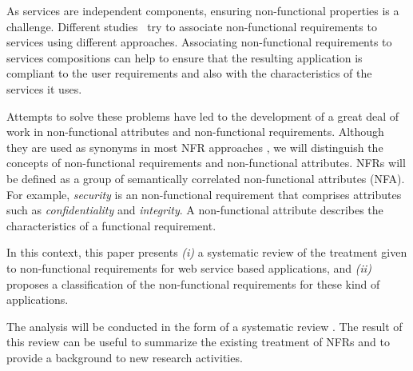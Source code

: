 \documentclass{sig-alternate}
\begin{document}
As services are independent components, ensuring non-functional properties is a
challenge.
Different
studies~\cite{Babamir2010,AgarwalLS09,CholletL09,GutierrezRF10,XiaoCZBOLH08,JeongCL09,TsadimasNA12}
try to associate non-functional requirements to services using different approaches. 
Associating non-functional requirements to services
compositions can help to ensure that the resulting application is compliant to
the user requirements and also with the characteristics of the services it uses.
 


 Attempts to solve these problems have led to the development of a great deal of
 work in non-functional attributes and non-functional requirements. Although
 they are used as synonyms in most NFR approaches \cite{MairizaZN10}, we will
 distinguish the concepts of non-functional requirements and non-functional attributes.
 NFRs will be defined as a group of semantically correlated
 non-functional attributes (NFA). For example, \textit{security} is an
 non-functional requirement that comprises attributes such as
 \textit{confidentiality} and \textit{integrity}. A non-functional
 attribute describes the characteristics of a functional requirement. 
 
In this context, this paper presents \textit{(i)} a systematic review
 of the treatment given to non-functional requirements for web service based applications, and
 \textit{(ii)} proposes a classification of the non-functional requirements for
these kind of applications.
 
 
The analysis will be conducted in the form of a systematic review
\cite{Kitchenham08}.
 The result of this review can be useful to summarize the existing treatment of NFRs and to provide a background to new research activities.
 
\end{document}
